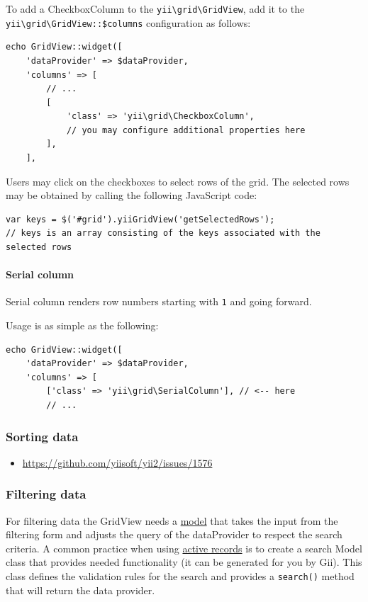 To add a CheckboxColumn to the \texttt{yii{\allowbreak{}\textbackslash}grid{\allowbreak{}\textbackslash}GridView}, add it to the \texttt{yii{\allowbreak{}\textbackslash}grid{\allowbreak{}\textbackslash}GridView\allowbreak{}::\allowbreak{}\$columns} configuration as follows:

\lstset{language=php}\begin{lstlisting}
echo GridView::widget([
    'dataProvider' => $dataProvider,
    'columns' => [
        // ...
        [
            'class' => 'yii\grid\CheckboxColumn',
            // you may configure additional properties here
        ],
    ],
\end{lstlisting}
Users may click on the checkboxes to select rows of the grid. The selected rows may be obtained by calling the following
JavaScript code:

\lstset{language=javascript}\begin{lstlisting}
var keys = $('#grid').yiiGridView('getSelectedRows');
// keys is an array consisting of the keys associated with the selected rows
\end{lstlisting}
\paragraph{Serial column}
Serial column renders row numbers starting with \lstinline|1| and going forward.

Usage is as simple as the following:

\lstset{language=php}\begin{lstlisting}
echo GridView::widget([
    'dataProvider' => $dataProvider,
    'columns' => [
        ['class' => 'yii\grid\SerialColumn'], // <-- here
        // ...
\end{lstlisting}
\subsubsection{Sorting data}
\begin{itemize}
\item \url{https://github.com/yiisoft/yii2/issues/1576}
\end{itemize}
\subsubsection{Filtering data}
For filtering data the GridView needs a \hyperref[model.md]{model} that takes the input from the filtering
form and adjusts the query of the dataProvider to respect the search criteria.
A common practice when using \hyperref[active-record.md]{active records} is to create a search Model class
that provides needed functionality (it can be generated for you by Gii). This class defines the validation 
rules for the search and provides a \lstinline|search()| method that will return the data provider.

